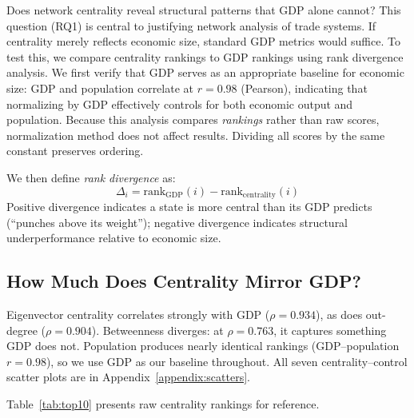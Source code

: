 \documentclass[12pt,oneside]{book}
\begin{document}
Does network centrality reveal structural patterns that GDP alone cannot? This question (RQ1) is central to justifying network analysis of trade systems. If centrality merely reflects economic size, standard GDP metrics would suffice. To test this, we compare centrality rankings to GDP rankings using rank divergence analysis. We first verify that GDP serves as an appropriate baseline for economic size: GDP and population correlate at $r = 0.98$ (Pearson), indicating that normalizing by GDP effectively controls for both economic output and population. Because this analysis compares \textit{rankings} rather than raw scores, normalization method does not affect results. Dividing all scores by the same constant preserves ordering. 

We then define \textit{rank divergence} as:
\[
\Delta_i = \text{rank}_{\text{GDP}}(i) - \text{rank}_{\text{centrality}}(i)
\]
Positive divergence indicates a state is more central than its GDP predicts (``punches above its weight''); negative divergence indicates structural underperformance relative to economic size.

\subsection{How Much Does Centrality Mirror GDP?}

Eigenvector centrality correlates strongly with GDP ($\rho = 0.934$), as does out-degree ($\rho = 0.904$). Betweenness diverges: at $\rho = 0.763$, it captures something GDP does not. Population produces nearly identical rankings (GDP--population $r = 0.98$), so we use GDP as our baseline throughout. All seven centrality--control scatter plots are in Appendix~\ref{appendix:scatters}.

Table~\ref{tab:top10} presents raw centrality rankings for reference.
\end{document}
